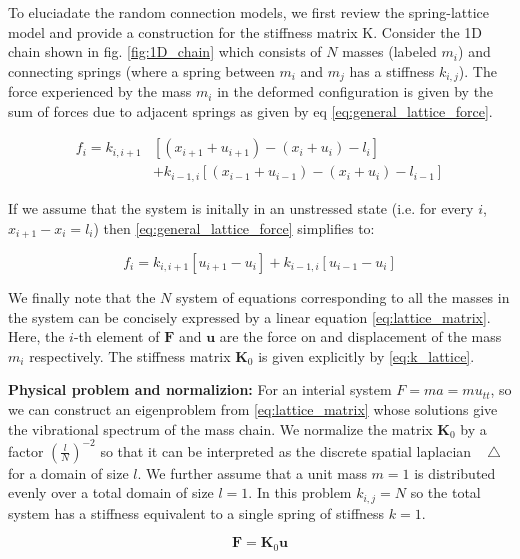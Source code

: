\documentclass{article}
\newcommand*\Laplace{\mathop{}\!\mathbin\bigtriangleup}
\begin{document}
To eluciadate the random connection models, we first review the spring-lattice model and provide a construction 
for the stiffness matrix K.
Consider the 1D chain shown in fig. \ref{fig:1D_chain} which consists of $N$ masses (labeled $m_i$) and connecting springs (where a spring between $m_i$ and $m_j$ has a stiffness $k_{i,j}$).
The force experienced by the mass $m_i$ in the deformed configuration is given by the sum of forces due to adjacent springs as given by eq \ref{eq:general_lattice_force}.

\begin{equation}\label{eq:general_lattice_force}
\begin{split}
	f_i = k_{i,i+1}&\left[ \left(x_{i+1} + u_{i+1} \right)- \left(x_{i} + u_{i} \right)  - l_i\right] \\
		 &+ k_{i-1,i}\left[ \left(x_{i-1} + u_{i-1} \right)- \left(x_{i} + u_{i} \right)  - l_{i-1}\right]
\end{split}
\end{equation}


If we assume that the system is initally in an unstressed state 
(i.e. for every $i$, $x_{i+1} - x_{i} = l_i$) then \ref{eq:general_lattice_force} simplifies to:

\begin{equation}\label{eq:lattice_force}
	f_i = k_{i,i+1}\left[u_{i+1} - u_i\right] + k_{i-1, i}\left[u_{i-1} - u_{i}\right]
\end{equation}

We finally note that the $N$ system of equations corresponding to all the masses in the system can be concisely expressed by a linear equation \ref{eq:lattice_matrix}.
Here, the $i$-th element of $\bm{F}$ and $\bm{u}$ are the force on and displacement of the mass $m_i$ respectively.
The stiffness matrix $\bm{K}_0$ is given explicitly by \ref{eq:k_lattice}.

\textbf{Physical problem and normalizion:} For an interial system $F=ma=mu_{tt}$, so we can construct an eigenproblem from \ref{eq:lattice_matrix} whose solutions give the 
vibrational spectrum of the mass chain. 
We normalize the matrix $\bm{K}_0$ by a factor $\left(\frac{l}{N}\right)^{-2}$ so that it can be interpreted as the discrete spatial laplacian $\Laplace$ for a domain of size $l$. 
We further assume that a unit mass $m=1$ is distributed evenly over a total domain of size $l=1$.
In this problem $k_{i,j} = N$ so the total system has a stiffness equivalent to a single spring of stiffness $k=1$.

\begin{equation}\label{eq:lattice_matrix}
	\bm{F} = \bm{K}_0\bm{u} 
\end{equation}
\end{document}
